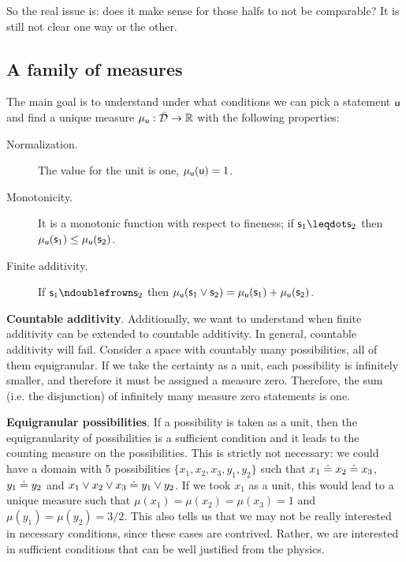 \documentclass[11pt]{article}
\begin{document}
So the real issue is: does it make sense for those halfs to not be comparable? It is still not clear one way or the other.

\subsection{A family of measures}

The main goal is to understand under what conditions we can pick a statement $\stmt[u]$ and find a unique measure $\mu_{\stmt[u]} : \tdomain \to \mathbb{R}$ with the following properties:
\begin{description}
    \item[Normalization.] The value for the unit is one,  $\mu_{\stmt[u]}(\stmt[u]) = 1$.
    \item[Monotonicity.] It is a monotonic function with respect to fineness; if $\stmt_1 \finer \stmt_2$ then $\mu_{\stmt[u]}(\stmt_1) \leq \mu_{\stmt[u]}(\stmt_2)$.
    \item[Finite additivity.] If $\stmt_1 \ncomp \stmt_2$ then $\mu_{\stmt[u]}(\stmt_1 \OR \stmt_2) = \mu_{\stmt[u]}(\stmt_1) + \mu_{\stmt[u]}(\stmt_2)$.
\end{description}

\textbf{Countable additivity}. Additionally, we want to understand when finite additivity can be extended to countable additivity. In general, countable additivity will fail. Consider a space with countably many possibilities, all of them equigranular. If we take the certainty as a unit, each possibility is infinitely smaller, and therefore it must be assigned a measure zero. Therefore, the sum (i.e. the disjunction) of infinitely many measure zero statements is one. 

\textbf{Equigranular possibilities}. If a possibility is taken as a unit, then the equigranularity of possibilities is a sufficient condition and it leads to the counting measure on the possibilities. This is strictly not necessary: we could have a domain with 5 possibilities $\{x_1, x_2, x_3, y_1, y_2\}$ such that $x_1 \eqgran x_2 \eqgran x_3$, $y_1 \eqgran y_2$ and $x_1 \OR x_2 \OR x_3 \eqgran y_1 \OR y_2$. If we took $x_1$ as a unit, this would lead to a unique measure such that $\mu(x_1)=\mu(x_2)=\mu(x_3)=1$ and $\mu(y_1)=\mu(y_2)=3/2$. This also tells us that we may not be really interested in necessary conditions, since these cases are contrived. Rather, we are interested in sufficient conditions that can be well justified from the physics.
\end{document}
